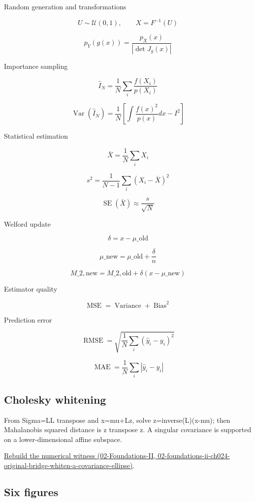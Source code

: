 Random generation and transformations

\[
 U\sim\mathcal U(0,1),\qquad X=F^{-1}(U) 
\]

\[
 p_Y(g(x)) = \frac{p_X(x)}{|\det J_g(x)|} 
\]

Importance sampling

\[
 \widehat I_N= \frac1N\sum_i\frac{f(X_i)}{p(X_i)} 
\]

\[
 \operatorname{Var}(\widehat I_N) = \frac1N \left[ \int\frac{f(x)^2}{p(x)}dx-I^2 \right] 
\]

Statistical estimation

\[
 \bar X=\frac1N\sum_iX_i 
\]

\[
 s^2=\frac1{N-1}\sum_i(X_i-\bar X)^2 
\]

\[
 \operatorname{SE}(\bar X)\approx\frac{s}{\sqrt N} 
\]

Welford update

\[
 \delta=x-\mu\_{\mathrm{old}} 
\]

\[
 \mu\_{\mathrm{new}}= \mu\_{\mathrm{old}}+\frac{\delta}{n} 
\]

\[
 M\_{2,\mathrm{new}}= M\_{2,\mathrm{old}}+ \delta(x-\mu\_{\mathrm{new}}) 
\]

Estimator quality

\[
 \operatorname{MSE}= \operatorname{Variance}+ \operatorname{Bias}^2 
\]

Prediction error

\[
 \operatorname{RMSE}= \sqrt{\frac1N\sum_i(\hat y_i-y_i)^2} 
\]

\[
 \operatorname{MAE}= \frac1N\sum_i|\hat y_i-y_i| 
\]

\subsection{Cholesky whitening}\label{appendix-cb5af353ef77-cholesky-whitening}

From Sigma=LL transpose and x=mu+Lz, solve z=inverse(L)(x-mu); then Mahalanobis squared distance is z transpose z. A singular covariance is supported on a lower-dimensional affine subspace.

\href{../02-Foundations-II/main.pdf\#nameddest=02-foundations-ii-ch024-original-bridge-whiten-a-covariance-ellipse}{Rebuild the numerical witness (02-Foundations-II, 02-foundations-ii-ch024-original-bridge-whiten-a-covariance-ellipse)}.

\subsection{Six figures}\label{appendix-cb5af353ef77-six-figures}

